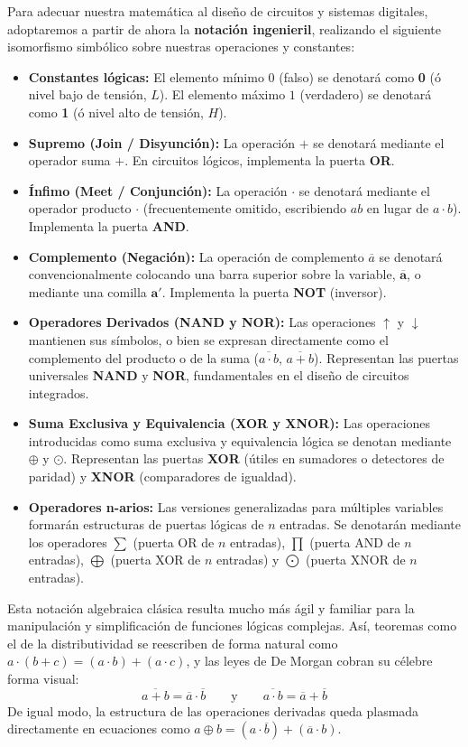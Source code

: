 Para adecuar nuestra matemática al diseño de circuitos y sistemas digitales, adoptaremos a partir de ahora la \textbf{notación ingenieril}, realizando el siguiente isomorfismo simbólico sobre nuestras operaciones y constantes:
\begin{itemize}
    \item \textbf{Constantes lógicas:} El elemento mínimo $0$ (falso) se denotará como \textbf{0} (ó nivel bajo de tensión, $L$). El elemento máximo $1$ (verdadero) se denotará como \textbf{1} (ó nivel alto de tensión, $H$).
    \item \textbf{Supremo (Join / Disyunción):} La operación $+$ se denotará mediante el operador suma $\mathbf{+}$. En circuitos lógicos, implementa la puerta \textbf{OR}.
    \item \textbf{Ínfimo (Meet / Conjunción):} La operación $\cdot$ se denotará mediante el operador producto $\mathbf{\cdot}$ (frecuentemente omitido, escribiendo $ab$ en lugar de $a \cdot b$). Implementa la puerta \textbf{AND}.
    \item \textbf{Complemento (Negación):} La operación de complemento $\overline{a}$ se denotará convencionalmente colocando una barra superior sobre la variable, $\mathbf{\overline{a}}$, o mediante una comilla $\mathbf{a'}$. Implementa la puerta \textbf{NOT} (inversor).
    \item \textbf{Operadores Derivados (NAND y NOR):} Las operaciones $\uparrow$ y $\downarrow$ mantienen sus símbolos, o bien se expresan directamente como el complemento del producto o de la suma ($\overline{a \cdot b}$, $\overline{a+b}$). Representan las puertas universales \textbf{NAND} y \textbf{NOR}, fundamentales en el diseño de circuitos integrados.
    \item \textbf{Suma Exclusiva y Equivalencia (XOR y XNOR):} Las operaciones introducidas como suma exclusiva y equivalencia lógica se denotan mediante $\mathbf{\oplus}$ y $\mathbf{\odot}$. Representan las puertas \textbf{XOR} (útiles en sumadores o detectores de paridad) y \textbf{XNOR} (comparadores de igualdad).
    \item \textbf{Operadores n-arios:} Las versiones generalizadas para múltiples variables formarán estructuras de puertas lógicas de $n$ entradas. Se denotarán mediante los operadores $\sum$ (puerta OR de $n$ entradas), $\prod$ (puerta AND de $n$ entradas), $\bigoplus$ (puerta XOR de $n$ entradas) y $\bigodot$ (puerta XNOR de $n$ entradas).
\end{itemize}

Esta notación algebraica clásica resulta mucho más ágil y familiar para la manipulación y simplificación de funciones lógicas complejas. Así, teoremas como el de la distributividad se reescriben de forma natural como $a \cdot (b + c) = (a \cdot b) + (a \cdot c)$, y las leyes de De Morgan cobran su célebre forma visual:
\[ \overline{a + b} = \overline{a} \cdot \overline{b} \qquad \text{y} \qquad \overline{a \cdot b} = \overline{a} + \overline{b} \]
De igual modo, la estructura de las operaciones derivadas queda plasmada directamente en ecuaciones como $a \oplus b = (a \cdot \overline{b}) + (\overline{a} \cdot b)$.

